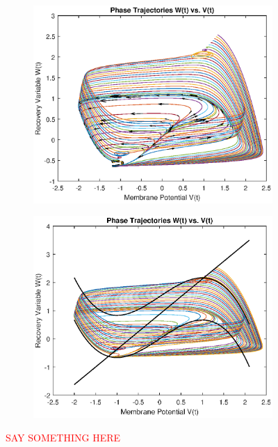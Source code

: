 \documentclass{book}
\theoremstyle{definition}
\begin{document}
\begin{figure}[!htb]
	\centering
	\begin{subfigure}{0.5\textwidth}
		\centering
		\includegraphics[scale=0.6]{FHN_lab/V_W_I_3.eps}
	\end{subfigure}%
	\begin{subfigure}{0.5\textwidth}
		\centering
		\includegraphics[scale=0.6]{FHN_lab/V_W_I_6.eps}
		
	\end{subfigure}%
	\caption{\textcolor{red}{SAY SOMETHING HERE}}
	\label{Fig:15}
\end{figure}
\end{document}

